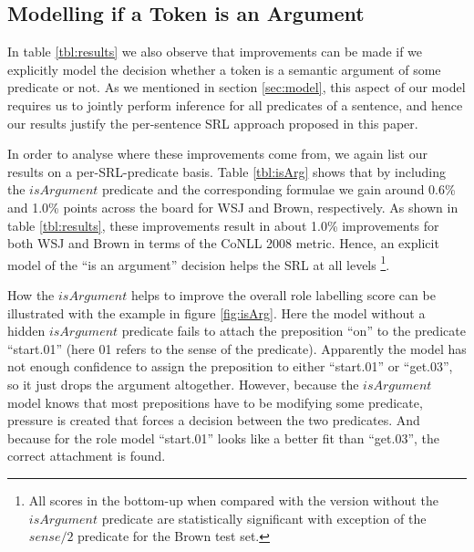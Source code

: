 
\subsection{Modelling if a Token is an Argument}
In table \ref{tbl:results} we also observe that improvements can be made if we explicitly model the decision whether a token is a semantic argument of some predicate or not. As we mentioned in section \ref{sec:model}, this aspect of our model requires us to jointly perform inference for all predicates of a sentence, and hence our results justify the per-sentence SRL approach proposed in this paper.

In order to analyse where these improvements come from, we again list our results on a per-SRL-predicate basis. Table \ref{tbl:isArg} shows that by including the $isArgument$ predicate and the corresponding formulae we gain around 0.6\% and 1.0\% points across the board for WSJ and Brown, respectively. As shown in table \ref{tbl:results}, these improvements result in about 1.0\% improvements for both WSJ and Brown in terms of the CoNLL 2008 metric. Hence, an explicit model of the ``is an argument'' decision helps the SRL at all levels \footnote{All scores in the bottom-up when compared with the version without the $isArgument$ predicate are statistically significant with exception of the $sense/2$ predicate for the Brown test set.}.

How the $isArgument$ helps to improve the overall role labelling score can be illustrated with the example in figure \ref{fig:isArg}. Here the model without a hidden $isArgument$ predicate fails to attach the preposition ``on'' to the predicate ``start.01'' (here 01 refers to the sense of the predicate). Apparently the model has not enough confidence to assign the preposition to either ``start.01'' or ``get.03'', so it just drops the argument altogether. However, because the $isArgument$ model knows that most prepositions have to be modifying some predicate, pressure is created that forces a decision between the two predicates. And because for the role model ``start.01'' looks like a better fit than ``get.03'', the correct attachment is found.

